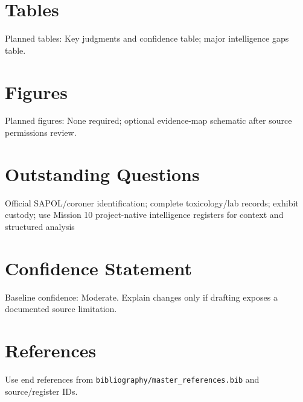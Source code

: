 \section{Tables}
Planned tables: Key judgments and confidence table; major intelligence gaps table.

\section{Figures}
Planned figures: None required; optional evidence-map schematic after source permissions review.

\section{Outstanding Questions}
Official SAPOL/coroner identification; complete toxicology/lab records; exhibit custody; use Mission 10 project-native intelligence registers for context and structured analysis

\section{Confidence Statement}
Baseline confidence: Moderate. Explain changes only if drafting exposes a documented source limitation.

\section{References}
Use end references from \texttt{bibliography/master_references.bib} and source/register IDs.

